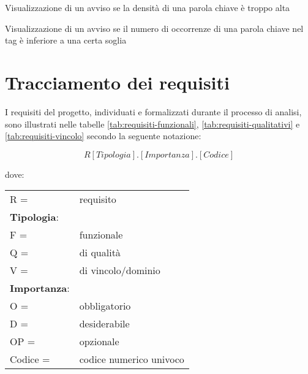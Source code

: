 \begin{usecase}{11}{Visualizzazione di un avviso se la densità di una parola chiave è troppo alta}\label{UC11}
\end{usecase}

\begin{usecase}{12}{Visualizzazione di un avviso se il numero di occorrenze di una parola chiave nel tag è inferiore a una certa soglia}\label{UC12}
\end{usecase}

\newpage

\section{Tracciamento dei requisiti}
\par I requisiti del progetto, individuati e formalizzati durante il processo di analisi, sono illustrati nelle tabelle \ref{tab:requisiti-funzionali}, \ref{tab:requisiti-qualitativi} e \ref{tab:requisiti-vincolo} secondo la seguente notazione:
\par \textbf{\[R[Tipologia].[Importanza].[Codice]\]} 
\par dove:
\par\vspace{20pt}
\begin{tabular}{@{}ll@{}}
    R = & requisito \\
    \textbf{Tipologia}: & \\
    \quad F = & funzionale \\
    \quad Q = & di qualità \\
    \quad V = & di vincolo/dominio \\
    \textbf{Importanza}: & \\
    \quad O = & obbligatorio \\
    \quad D = & desiderabile \\  
    \quad OP = & opzionale \\
    Codice = & codice numerico univoco \\
\end{tabular}
    
